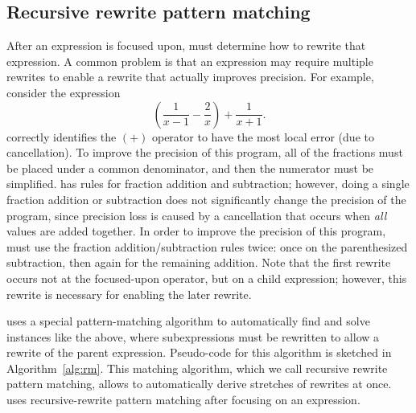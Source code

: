 \documentclass[paper.tex]{subfiles}
\begin{document}
\subsection{Recursive rewrite pattern matching}

After an expression is focused upon,
  \casio must determine how to rewrite that expression.
A common problem is that an expression may require multiple rewrites
  to enable a rewrite that actually improves precision.
For example, consider the expression
\[
 \left(\frac{1}{x-1} - \frac{2}{x} \right) + \frac{1}{x+1}.
\]
\casio correctly identifies the $(+)$ operator
  to have the most local error (due to cancellation).
To improve the precision of this program,
  all of the fractions must be placed under a common denominator,
  and then the numerator must be simplified.
\casio has rules for fraction addition and subtraction;
  however, doing a single fraction addition or subtraction
  does not significantly change the precision of the program,
  since precision loss is caused by a cancellation
  that occurs when \emph{all} values are added together.
In order to improve the precision of this program,
  \casio must use the fraction addition/subtraction rules twice:
  once on the parenthesized subtraction,
  then again for the remaining addition.
Note that the first rewrite occurs not at the focused-upon operator,
  but on a child expression; however, this rewrite
  is necessary for enabling the later rewrite.

\casio uses a special pattern-matching algorithm
  to automatically find and solve instances like the above,
  where subexpressions must be rewritten
  to allow a rewrite of the parent expression.
Pseudo-code for this algorithm is sketched in Algorithm~\ref{alg:rm}.
This matching algorithm, which we call recursive rewrite pattern matching,
  allows \casio to automatically derive
  stretches of  rewrites at once.
\casio uses recursive-rewrite pattern matching
  after focusing on an expression.
\end{document}
